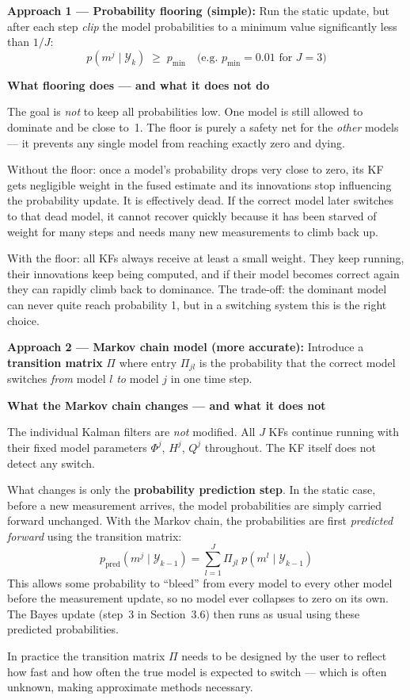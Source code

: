 \documentclass[12pt, a4paper]{article}
\begin{document}
\textbf{Approach 1 --- Probability flooring (simple):}
Run the static update, but after each step \emph{clip} the model
probabilities to a minimum value significantly less than $1/J$:
\[
  p(m^j \mid \mathcal{Y}_k) \;\geq\; p_{\min}
  \quad\text{(e.g.\ } p_{\min} = 0.01 \text{ for } J = 3\text{)}
\]
\begin{notebox}
  \textbf{What flooring does --- and what it does not do}

  The goal is \emph{not} to keep all probabilities low.
  One model is still allowed to dominate and be close to~1.
  The floor is purely a safety net for the \emph{other} models ---
  it prevents any single model from reaching exactly zero and dying.

  Without the floor: once a model's probability drops very close to
  zero, its KF gets negligible weight in the fused estimate and its
  innovations stop influencing the probability update.
  It is effectively dead.
  If the correct model later switches to that dead model, it cannot
  recover quickly because it has been starved of weight for many steps
  and needs many new measurements to climb back up.

  With the floor: all KFs always receive at least a small weight.
  They keep running, their innovations keep being computed, and if their
  model becomes correct again they can rapidly climb back to dominance.
  The trade-off: the dominant model can never quite reach probability 1,
  but in a switching system this is the right choice.
\end{notebox}

\textbf{Approach 2 --- Markov chain model (more accurate):}
Introduce a \textbf{transition matrix} $\Pi$ where entry $\Pi_{jl}$
is the probability that the correct model switches \emph{from} model
$l$ \emph{to} model $j$ in one time step.

\begin{notebox}
  \textbf{What the Markov chain changes --- and what it does not}

  The individual Kalman filters are \emph{not} modified.
  All $J$ KFs continue running with their fixed model parameters
  $\Phi^j$, $H^j$, $Q^j$ throughout.
  The KF itself does not detect any switch.

  What changes is only the \textbf{probability prediction step}.
  In the static case, before a new measurement arrives, the model
  probabilities are simply carried forward unchanged.
  With the Markov chain, the probabilities are first
  \emph{predicted forward} using the transition matrix:
  \[
    p_{\text{pred}}(m^j \mid \mathcal{Y}_{k-1})
    = \sum_{l=1}^{J} \Pi_{jl}\;p(m^l \mid \mathcal{Y}_{k-1})
  \]
  This allows some probability to ``bleed'' from every model to every
  other model before the measurement update, so no model ever collapses
  to zero on its own.
  The Bayes update (step~3 in Section~3.6) then runs as usual using
  these predicted probabilities.

  In practice the transition matrix $\Pi$ needs to be designed by the
  user to reflect how fast and how often the true model is expected to
  switch --- which is often unknown, making approximate methods
  necessary.
\end{notebox}
\end{document}
